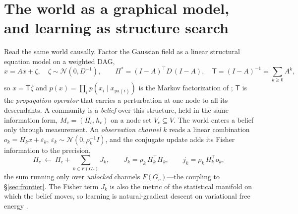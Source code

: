\documentclass[11pt]{article}
\newcommand{\Top}{\mathsf{T}}          %
\theoremstyle{definition}
\theoremstyle{plain}
\begin{document}
\section{The world as a graphical model, and learning as structure search}
\label{sec:pgm}

Read the same world causally. Factor the Gaussian field as a linear structural equation model on a
weighted DAG,
\begin{equation}
x=Ax+\zeta,\quad \zeta\sim\mathcal N(0,D^{-1}),\qquad
\Pi^\ast=(I-A)^\top D\,(I-A),\quad \Top=(I-A)^{-1}=\sum_{k\ge0}A^{k},
\label{eq:sem}
\end{equation}
so $x=\Top\zeta$ and $p(x)=\prod_i p(x_i\mid x_{\mathrm{pa}(i)})$ is the Markov factorization of
\citet{pearl2009,kollerfriedman2009}; $\Top$ is the \emph{propagation operator} that carries a
perturbation at one node to all its descendants. A community is a \emph{belief} over this structure,
held in the same information form, $M_c=(\Pi_c,h_c)$ on a node set $V_c\subseteq V$. The world enters
a belief only through measurement. An \emph{observation channel} $k$ reads a linear combination
$o_k=H_k x+\varepsilon_k$, $\varepsilon_k\sim\mathcal N(0,\rho_k^{-1}I)$, and the conjugate update
adds its Fisher information to the precision,
\begin{equation}
\Pi_c\ \leftarrow\ \Pi_c+\!\!\sum_{k\in F(G_c)}\!\! J_k,\qquad
J_k=\rho_k\,H_k^\top H_k,\qquad j_k=\rho_k\,H_k^\top o_k,
\label{eq:fisher}
\end{equation}
the sum running only over \emph{unlocked} channels $F(G_c)$---the coupling to \S\ref{sec:frontier}.
The Fisher term $J_k$ is also the metric of the statistical manifold on which the belief moves, so
learning is natural-gradient descent on variational free energy \citep{amari2016}.
\end{document}
